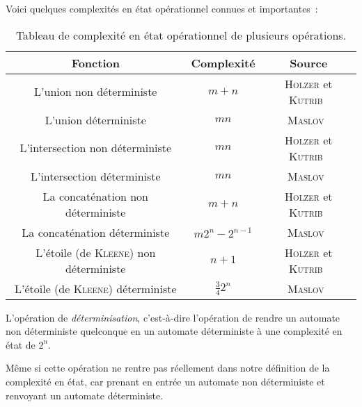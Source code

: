 \begin{example}
  Voici quelques complexités en état opérationnel connues et importantes~:
  \begin{table}[H]
    \centering
    \captionsetup{type=table,justification=centering}
    \renewcommand{\arraystretch}{2}
    \begin{tabular}{|c|c|c|}
    \hline
      \textbf{Fonction} & \textbf{Complexité} & \textbf{Source} \\
      \hline
      L'union non déterministe & \(m + n\) & \textsc{Holzer} et 
      \textsc{Kutrib}~\cite{holzer_kutrib} \\
      \hline
      L'union déterministe & \(m n\) & 
      \textsc{Maslov}~\cite{maslov1970estimates} \\
      \hline
      L'intersection non déterministe & \(m n\) & \textsc{Holzer} et 
      \textsc{Kutrib}~\cite{holzer_kutrib} \\
      \hline
      L'intersection déterministe & \(m n\) & 
      \textsc{Maslov}~\cite{maslov1970estimates} \\
      \hline
      La concaténation non déterministe & \(m + n\) & \textsc{Holzer} et 
      \textsc{Kutrib}~\cite{holzer_kutrib} \\
      \hline
      La concaténation déterministe & \(m 2^n - 2^{n - 1}\) & 
      \textsc{Maslov}~\cite{maslov1970estimates} \\
      \hline
      L'étoile (de \textsc{Kleene}) non déterministe & \(n + 1\) &
      \textsc{Holzer} et \textsc{Kutrib}~\cite{holzer_kutrib} \\
      \hline
      L'étoile (de \textsc{Kleene}) déterministe & \(\frac{3}{4}2^n\) & 
      \textsc{Maslov}~\cite{maslov1970estimates} \\
      \hline
    \end{tabular}
    \caption{
      Tableau de complexité en état opérationnel de plusieurs opérations.
    }
  \end{table}
\end{example}

\begin{remark}
  L'opération de \textit{déterminisation}, c'est-à-dire l'opération de rendre
  un automate non déterministe quelconque en un automate déterministe à une
  complexité en état de \(2^n\).

  Même si cette opération ne rentre pas réellement dans notre définition de la
  complexité en état, car prenant en entrée un automate non déterministe et
  renvoyant un automate déterministe.
\end{remark}
